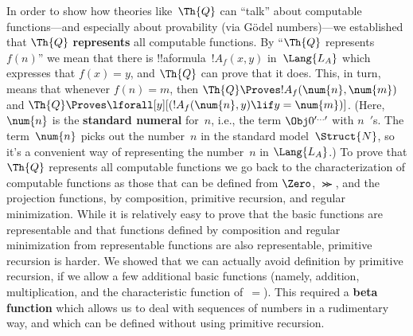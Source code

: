 In order to show how theories like~$\Th{Q}$ can ``talk'' about
computable functions---and especially about provability (via G\"odel
numbers)---we established that $\Th{Q}$ \textbf{represents} all
computable functions. By ``$\Th{Q}$ represents $f(n)$'' we mean that
there is !!a{formula}~$!A_f(x, y)$ in~$\Lang{L_A}$ which expresses
that $f(x) = y$, and $\Th{Q}$ can prove that it does.  This, in turn,
means that whenever $f(n) = m$, then $\Th{Q} \Proves !A_f(\num{n},
\num{m})$ and $\Th{Q} \Proves \lforall[y][(!A_f(\num{n}, y) \lif y =
\num{m})]$. (Here, $\num{n}$ is the \textbf{standard numeral} for~$n$,
i.e., the term $\Obj 0^{\prime\dots\prime}$ with $n$~$\prime$s. The
term~$\num{n}$ picks out the number~$n$ in the standard
model~$\Struct{N}$, so it's a convenient way of representing the
number~$n$ in $\Lang{L_A}$.) To prove that $\Th{Q}$ represents all
computable functions we go back to the characterization of computable
functions as those that can be defined from $\Zero$, $\Succ$, and the
projection functions, by composition, primitive recursion, and regular
minimization. While it is relatively easy to prove that the basic
functions are representable and that functions defined by composition
and regular minimization from representable functions are also
representable, primitive recursion is harder. We showed that we can
actually avoid definition by primitive recursion, if we allow a few
additional basic functions (namely, addition, multiplication, and the
characteristic function of~$=$). This required a \textbf{beta
function} which allows us to deal with sequences of numbers in a
rudimentary way, and which can be defined without using primitive
recursion.
